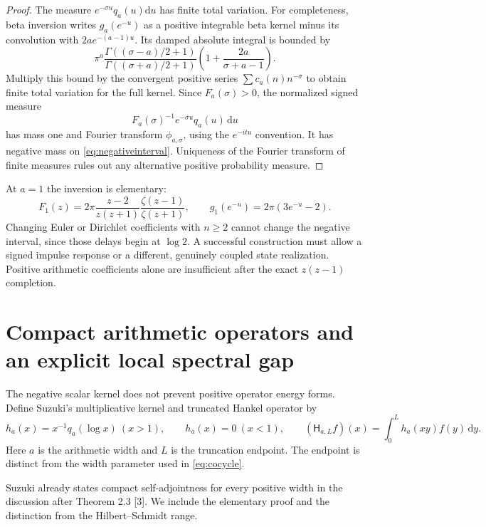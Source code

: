 \documentclass[11pt,letterpaper]{article}
\newcommand{\dd}{\mathrm d}
\begin{document}
\begin{proof}
The measure $e^{-\sigma u}q_a(u)\dd u$ has finite total variation. For completeness, beta inversion writes $g_a(e^{-u})$ as a positive integrable beta kernel minus its convolution with $2ae^{-(a-1)u}$. Its damped absolute integral is bounded by
\[
 \pi^a\frac{\Gamma((\sigma-a)/2+1)}{\Gamma((\sigma+a)/2+1)}
 \left(1+\frac{2a}{\sigma+a-1}\right).
\]
Multiply this bound by the convergent positive series $\sum c_a(n)n^{-\sigma}$ to obtain finite total variation for the full kernel. Since $F_a(\sigma)>0$, the normalized signed measure
\[
 F_a(\sigma)^{-1}e^{-\sigma u}q_a(u)\,\dd u
\]
has mass one and Fourier transform $\phi_{a,\sigma}$, using the $e^{-itu}$ convention. It has negative mass on \eqref{eq:negativeinterval}. Uniqueness of the Fourier transform of finite measures rules out any alternative positive probability measure.
\end{proof}

At $a=1$ the inversion is elementary:
\[
 F_1(z)=2\pi\frac{z-2}{z(z+1)}\frac{\zeta(z-1)}{\zeta(z+1)},\qquad
 g_1(e^{-u})=2\pi(3e^{-u}-2).
\]
Changing Euler or Dirichlet coefficients with $n\geq2$ cannot change the negative interval, since those delays begin at $\log2$. A successful construction must allow a signed impulse response or a different, genuinely coupled state realization. Positive arithmetic coefficients alone are insufficient after the exact $z(z-1)$ completion.

\section{Compact arithmetic operators and an explicit local spectral gap}
The negative scalar kernel does not prevent positive operator energy forms. Define Suzuki's multiplicative kernel and truncated Hankel operator by
\[
 h_a(x)=x^{-1}q_a(\log x)\ (x>1),\qquad h_a(x)=0\ (x<1),\qquad
 (\mathsf H_{a,L}f)(x)=\int_0^Lh_a(xy)f(y)\,\dd y.
\]
Here $a$ is the arithmetic width and $L$ is the truncation endpoint. The endpoint is distinct from the width parameter used in \eqref{eq:cocycle}.

Suzuki already states compact self-adjointness for every positive width in the discussion after Theorem 2.3 [3]. We include the elementary proof and the distinction from the Hilbert--Schmidt range.
\end{document}
